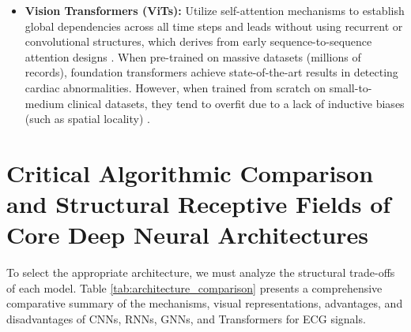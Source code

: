 \documentclass[12pt,a4paper]{report}
\begin{document}
\begin{itemize}
    \item \textbf{Vision Transformers (ViTs):} Utilize self-attention mechanisms to establish global dependencies across all time steps and leads without using recurrent or convolutional structures, which derives from early sequence-to-sequence attention designs \cite{bahdanau2014neural, vaswani2017attention, dosovitskiy2020image}. When pre-trained on massive datasets (millions of records), foundation transformers achieve state-of-the-art results in detecting cardiac abnormalities. However, when trained from scratch on small-to-medium clinical datasets, they tend to overfit due to a lack of inductive biases (such as spatial locality) \cite{vaid2023foundational, moody2025foundation, peimankar2021delineation}.
\end{itemize}

\section{Critical Algorithmic Comparison and Structural Receptive Fields of Core Deep Neural Architectures}
To select the appropriate architecture, we must analyze the structural trade-offs of each model. Table \ref{tab:architecture_comparison} presents a comprehensive comparative summary of the mechanisms, visual representations, advantages, and disadvantages of CNNs, RNNs, GNNs, and Transformers for ECG signals.
\end{document}
